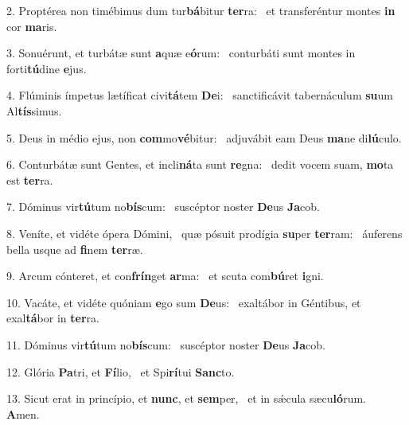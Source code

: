 2. Proptérea non timébimus dum tur\textbf{bá}bitur \textbf{ter}ra: \ast\  et transferéntur montes \textbf{in} cor \textbf{ma}ris.\

3. Sonuérunt, et turbátæ sunt \textbf{a}quæ e\textbf{ó}rum: \ast\  conturbáti sunt montes in forti\textbf{tú}dine \textbf{e}jus.\

4. Flúminis ímpetus lætíficat civi\textbf{tá}tem \textbf{De}i: \ast\  sanctificávit tabernáculum \textbf{su}um Al\textbf{tís}simus.\

5. Deus in médio ejus, non \textbf{com}mo\textbf{vé}bitur: \ast\  adjuvábit eam Deus \textbf{ma}ne di\textbf{lú}culo.\

6. Conturbátæ sunt Gentes, et incli\textbf{ná}ta sunt \textbf{re}gna: \ast\  dedit vocem suam, \textbf{mo}ta est \textbf{ter}ra.\

7. Dóminus vir\textbf{tú}tum no\textbf{bís}cum: \ast\  suscéptor noster \textbf{De}us \textbf{Ja}cob.\

8. Veníte, et vidéte ópera Dómini, \dag\  quæ pósuit prodígia \textbf{su}per \textbf{ter}ram: \ast\  áuferens bella usque ad \textbf{fi}nem \textbf{ter}ræ.\

9. Arcum cónteret, et con\textbf{frín}get \textbf{ar}ma: \ast\  et scuta com\textbf{bú}ret \textbf{i}gni.\

10. Vacáte, et vidéte quóniam \textbf{e}go sum \textbf{De}us: \ast\  exaltábor in Géntibus, et exal\textbf{tá}bor in \textbf{ter}ra.\

11. Dóminus vir\textbf{tú}tum no\textbf{bís}cum: \ast\  suscéptor noster \textbf{De}us \textbf{Ja}cob.\

12. Glória \textbf{Pa}tri, et \textbf{Fí}lio, \ast\  et Spi\textbf{rí}tui \textbf{Sanc}to.\

13. Sicut erat in princípio, et \textbf{nunc}, et \textbf{sem}per, \ast\  et in sǽcula sæcu\textbf{ló}rum. \textbf{A}men.\

